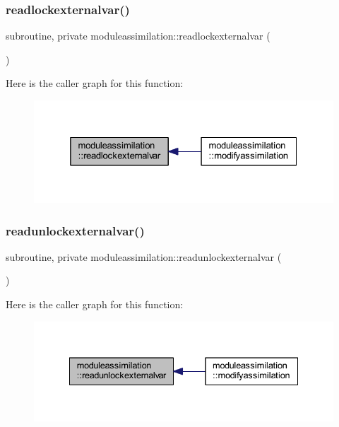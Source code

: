 \subsubsection{\texorpdfstring{readlockexternalvar()}{readlockexternalvar()}}
{\footnotesize\ttfamily subroutine, private moduleassimilation\+::readlockexternalvar (\begin{DoxyParamCaption}{ }\end{DoxyParamCaption})\hspace{0.3cm}{\ttfamily [private]}}

Here is the caller graph for this function\+:\nopagebreak
\begin{figure}[H]
\begin{center}
\leavevmode
\includegraphics[width=325pt]{namespacemoduleassimilation_ad7f96fa745bdccdc0281d15675836a9b_icgraph}
\end{center}
\end{figure}
\mbox{\label{namespacemoduleassimilation_a3215402dbc1d7602c94ca05f33ce52a7}} 
\subsubsection{\texorpdfstring{readunlockexternalvar()}{readunlockexternalvar()}}
{\footnotesize\ttfamily subroutine, private moduleassimilation\+::readunlockexternalvar (\begin{DoxyParamCaption}{ }\end{DoxyParamCaption})\hspace{0.3cm}{\ttfamily [private]}}

Here is the caller graph for this function\+:\nopagebreak
\begin{figure}[H]
\begin{center}
\leavevmode
\includegraphics[width=335pt]{namespacemoduleassimilation_a3215402dbc1d7602c94ca05f33ce52a7_icgraph}
\end{center}
\end{figure}
\mbox{\label{namespacemoduleassimilation_a7c7eb17646a26837c5dfb9acc963b010}} 
